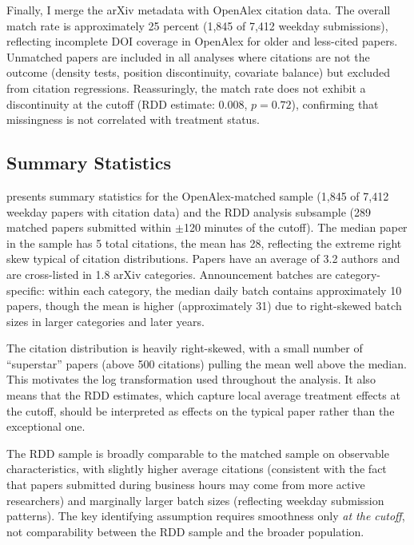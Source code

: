\documentclass[12pt]{article}
\begin{document}
Finally, I merge the arXiv metadata with OpenAlex citation data. The overall match rate is approximately 25 percent (1,845 of 7,412 weekday submissions), reflecting incomplete DOI coverage in OpenAlex for older and less-cited papers. Unmatched papers are included in all analyses where citations are not the outcome (density tests, position discontinuity, covariate balance) but excluded from citation regressions. Reassuringly, the match rate does not exhibit a discontinuity at the cutoff (RDD estimate: 0.008, $p = 0.72$), confirming that missingness is not correlated with treatment status.

\subsection{Summary Statistics}

 presents summary statistics for the OpenAlex-matched sample (1,845 of 7,412 weekday papers with citation data) and the RDD analysis subsample (289 matched papers submitted within $\pm$120 minutes of the cutoff). The median paper in the sample has 5 total citations, the mean has 28, reflecting the extreme right skew typical of citation distributions. Papers have an average of 3.2 authors and are cross-listed in 1.8 arXiv categories. Announcement batches are category-specific: within each category, the median daily batch contains approximately 10 papers, though the mean is higher (approximately 31) due to right-skewed batch sizes in larger categories and later years.

The citation distribution is heavily right-skewed, with a small number of ``superstar'' papers (above 500 citations) pulling the mean well above the median. This motivates the log transformation used throughout the analysis. It also means that the RDD estimates, which capture local average treatment effects at the cutoff, should be interpreted as effects on the typical paper rather than the exceptional one.

The RDD sample is broadly comparable to the matched sample on observable characteristics, with slightly higher average citations (consistent with the fact that papers submitted during business hours may come from more active researchers) and marginally larger batch sizes (reflecting weekday submission patterns). The key identifying assumption requires smoothness only \textit{at the cutoff}, not comparability between the RDD sample and the broader population.


\end{document}
